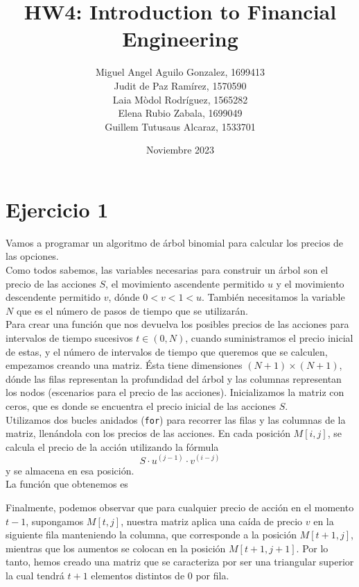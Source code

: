 \documentclass[a4paper,]{article}
\title{\textbf{HW4: Introduction to Financial Engineering}}
\author{Miguel Angel Aguilo Gonzalez, 1699413 \\ Judit de Paz Ramírez, 1570590 \\ Laia Mòdol Rodríguez, 1565282 \\ Elena Rubio Zabala, 1699049 \\ Guillem Tutusaus Alcaraz, 1533701 }
\date{Noviembre 2023}
\begin{document}
\maketitle
\newpage

\section*{Ejercicio 1}
Vamos a programar un algoritmo de árbol binomial para calcular los precios de las opciones. \\

Como todos sabemos, las variables necesarias para construir un árbol son el precio de las acciones $S$, el movimiento ascendente permitido $u$ y el movimiento descendente permitido $v$, dónde $0<v<1<u$. También necesitamos la variable $N$ que es el número de pasos de tiempo que se utilizarán.\\

Para crear una función que nos devuelva los posibles precios de las acciones para intervalos de tiempo sucesivos $t\in(0,N)$, cuando suministramos el precio inicial de estas, y el número de intervalos de tiempo que queremos que se calculen, empezamos creando una matriz. Ésta tiene dimensiones $(N+1)\times(N+1)$, dónde las filas representan la profundidad del árbol y las columnas representan los nodos (escenarios para el precio de las acciones). Inicializamos la matriz con ceros, que es donde se encuentra el precio inicial de las acciones $S$. \\

Utilizamos dos bucles anidados (\texttt{for}) para recorrer las filas y las columnas de la matriz, llenándola con los precios de las acciones. En cada posición $M[i, j]$, se calcula el precio de la acción utilizando la fórmula $$S \cdot u^{(j - 1)} \cdot v^{(i - j)}$$ y se almacena en esa posición. \\

La función que obtenemos es
\vspace{1cm}

Finalmente, podemos observar que para cualquier precio de acción en el momento $t-1$, supongamos $M[t,j]$, nuestra matriz aplica una caída de precio $v$ en la siguiente fila manteniendo la columna, que corresponde a la posición $M[t + 1,j]$, mientras que los aumentos se colocan en la posición $M[t + 1,j + 1]$. Por lo tanto, hemos creado una matriz que se caracteriza por ser una triangular superior la cual tendrá $t+1$ elementos distintos de 0 por fila. \\
\end{document}
